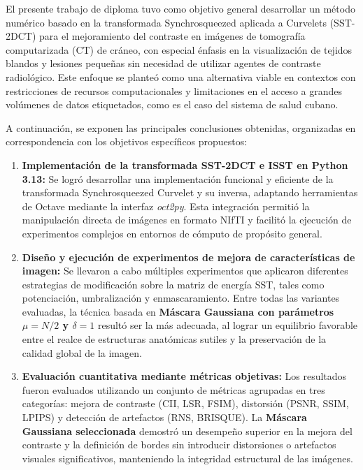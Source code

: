 \begin{conclusions}
    El presente trabajo de diploma tuvo como objetivo general desarrollar un método numérico basado en la transformada Synchrosqueezed aplicada a Curvelets (SST-2DCT) para el mejoramiento del contraste en imágenes de tomografía computarizada (CT) de cráneo, con especial énfasis en la visualización de tejidos blandos y lesiones pequeñas sin necesidad de utilizar agentes de contraste radiológico. Este enfoque se planteó como una alternativa viable en contextos con restricciones de recursos computacionales y limitaciones en el acceso a grandes volúmenes de datos etiquetados, como es el caso del sistema de salud cubano.

    \bigskip

    A continuación, se exponen las principales conclusiones obtenidas, organizadas en correspondencia con los objetivos específicos propuestos:

    \begin{enumerate}
        \item \textbf{Implementación de la transformada SST-2DCT e ISST en Python 3.13:} Se logró desarrollar una implementación funcional y eficiente de la transformada Synchrosqueezed Curvelet y su inversa, adaptando herramientas de Octave mediante la interfaz \textit{oct2py}. Esta integración permitió la manipulación directa de imágenes en formato NIfTI y facilitó la ejecución de experimentos complejos en entornos de cómputo de propósito general.

        \item \textbf{Diseño y ejecución de experimentos de mejora de características de imagen:} Se llevaron a cabo múltiples experimentos que aplicaron diferentes estrategias de modificación sobre la matriz de energía SST, tales como potenciación, umbralización y enmascaramiento. Entre todas las variantes evaluadas, la técnica basada en \textbf{Máscara Gaussiana con parámetros $\mu = N/2$ y $\delta = 1$} resultó ser la más adecuada, al lograr un equilibrio favorable entre el realce de estructuras anatómicas sutiles y la preservación de la calidad global de la imagen.

        \item \textbf{Evaluación cuantitativa mediante métricas objetivas:} Los resultados fueron evaluados utilizando un conjunto de métricas agrupadas en tres categorías: mejora de contraste (CII, LSR, FSIM), distorsión (PSNR, SSIM, LPIPS) y detección de artefactos (RNS, BRISQUE). La \textbf{Máscara Gaussiana seleccionada} demostró un desempeño superior en la mejora del contraste y la definición de bordes sin introducir distorsiones o artefactos visuales significativos, manteniendo la integridad estructural de las imágenes.


\end{enumerate}
\end{conclusions}

